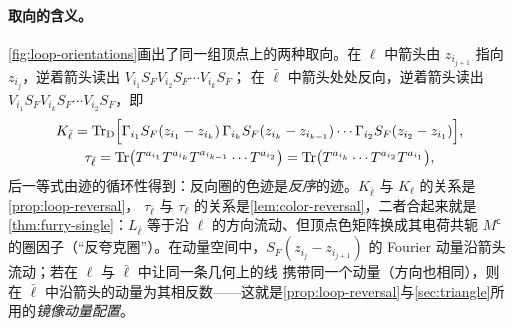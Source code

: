 \documentclass[UTF8,a4paper,11pt,fontset=fandol]{ctexart}
\theoremstyle{cplain}
\theoremstyle{cdefinition}
\theoremstyle{cremark}
\numberwithin{equation}{section}
\DeclareMathOperator{\Tr}{Tr}
\newcommand{\TrD}{\operatorname{Tr}_{\mathrm{D}}}   %
\newcommand{\SF}{S_{F}}                              %
\begin{document}
\paragraph{取向的含义。}
\cref{fig:loop-orientations}画出了同一组顶点上的两种取向。在 $\ell$ 中箭头由 $z_{i_{j+1}}$ 指向 $z_{i_j}$，逆着箭头读出 $V_{i_1}\SF V_{i_2}\SF\cdots V_{i_k}\SF$；
在 $\bar\ell$ 中箭头处处反向，逆着箭头读出 $V_{i_1}\SF V_{i_k}\SF\cdots V_{i_2}\SF$，即
\begin{equation}\label{eq:setup-reversed}
\begin{gathered}
K_{\bar\ell}=\TrD\Bigl[\Gamma_{i_1}\SF(z_{i_1}-z_{i_k})\,\Gamma_{i_k}\SF(z_{i_k}-z_{i_{k-1}})\cdots\Gamma_{i_2}\SF(z_{i_2}-z_{i_1})\Bigr],\\
\tau_{\bar\ell}=\Tr\bigl(T^{a_{i_1}}T^{a_{i_k}}T^{a_{i_{k-1}}}\cdots T^{a_{i_2}}\bigr)=\Tr\bigl(T^{a_{i_k}}\cdots T^{a_{i_2}}T^{a_{i_1}}\bigr),
\end{gathered}
\end{equation}
后一等式由迹的循环性得到：反向圈的色迹是\emph{反序}的迹。$K_{\bar\ell}$ 与 $K_\ell$ 的关系是\cref{prop:loop-reversal}，
$\tau_{\bar\ell}$ 与 $\tau_\ell$ 的关系是\cref{lem:color-reversal}，二者合起来就是\cref{thm:furry-single}：$L_{\bar\ell}$ 等于沿 $\ell$ 的方向流动、但顶点色矩阵换成其电荷共轭
$M^{\mathsf c}$ 的圈因子（“反夸克圈”）。在动量空间中，$\SF(z_{i_j}-z_{i_{j+1}})$ 的 Fourier 动量沿箭头流动；若在 $\ell$ 与 $\bar\ell$ 中让同一条几何上的线
携带同一个动量（方向也相同），则在 $\bar\ell$ 中沿箭头的动量为其相反数——这就是\cref{prop:loop-reversal}与\cref{sec:triangle}所用的\emph{镜像动量配置}。
\end{document}
